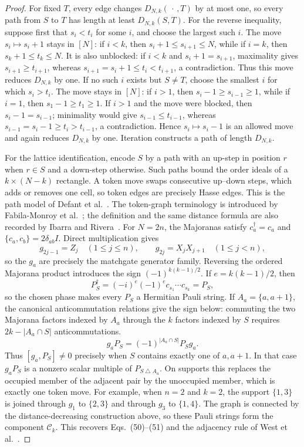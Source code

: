 \documentclass[twoside,10pt]{article}
\numberwithin{equation}{section}
\theoremstyle{slbody}
\theoremstyle{definition}
\theoremstyle{remark}
\newcommand{\1}{\mathbf{1}}
\begin{document}
\begin{proof}
For fixed $T$, every edge changes $D_{N,k}(\,\cdot\,,T)$ by at most one, so
every path from $S$ to $T$ has length at least $D_{N,k}(S,T)$.  For the reverse
inequality, suppose first
that $s_i<t_i$ for some $i$, and choose the largest such $i$.  The move
$s_i\mapsto s_i+1$ stays in $[N]$: if $i<k$, then
$s_i+1\leq s_{i+1}\leq N$, while if $i=k$, then
$s_k+1\leq t_k\leq N$.  It is also unblocked: if $i<k$ and
$s_i+1=s_{i+1}$, maximality gives $s_{i+1}\geq t_{i+1}$, whereas
$s_{i+1}=s_i+1\leq t_i<t_{i+1}$, a contradiction.  Thus this move reduces
$D_{N,k}$ by one.  If no such $i$ exists but $S\neq T$, choose the smallest
$i$ for which $s_i>t_i$.  The move stays in $[N]$: if $i>1$, then
$s_i-1\geq s_{i-1}\geq1$, while if $i=1$, then
$s_1-1\geq t_1\geq1$.  If $i>1$ and the move were blocked, then
$s_i-1=s_{i-1}$; minimality would give $s_{i-1}\leq t_{i-1}$, whereas
$s_{i-1}=s_i-1\geq t_i>t_{i-1}$, a contradiction.  Hence
$s_i\mapsto s_i-1$ is an allowed move and again reduces $D_{N,k}$ by one.
Iteration constructs a path of length $D_{N,k}$.

For the lattice identification, encode $S$ by a path with an up-step in
position $r$ when $r\in S$ and a down-step otherwise.  Such paths bound the
order ideals of a $k\times(N-k)$ rectangle.  A token move swaps consecutive
up--down steps, which adds or removes one cell, so token edges are precisely
Hasse edges.  This is the path model of Defant et
al.~\cite[Section~1.3 and Eq.~(2)]{DefantEtAl}.  The token-graph terminology
is introduced by Fabila-Monroy et al.~\cite{FabilaMonroy}; the definition and
the same distance formula are also recorded by Ibarra and
Rivera~\cite[Definition in Section~1 and Lemma~5.2]{IbarraRivera}.  For
$N=2n$, the Majoranas satisfy $c_a^\dagger=c_a$ and
$\{c_a,c_b\}=2\delta_{ab}I$.  Direct multiplication gives
\[
 g_{2j-1}=Z_j\quad(1\leq j\leq n),\qquad
 g_{2j}=X_jX_{j+1}\quad(1\leq j<n),
\]
so the $g_a$ are precisely the matchgate generator family.  Reversing the
ordered Majorana product introduces the sign
$(-1)^{k(k-1)/2}$.  If $e=k(k-1)/2$, then
\[
 P_S^\dagger=(-i)^e(-1)^e c_{s_1}\cdots c_{s_k}=P_S,
\]
so the chosen phase makes every $P_S$ a Hermitian Pauli string.  If
$A_a=\{a,a+1\}$, the canonical anticommutation
relations give the sign below: commuting the two Majorana factors indexed by
$A_a$ through the $k$ factors indexed by $S$ requires
$2k-|A_a\cap S|$ anticommutations.
\[
 g_aP_S=(-1)^{|A_a\cap S|}P_Sg_a.
\]
Thus $[g_a,P_S]\neq0$ precisely when $S$ contains exactly one of $a,a+1$.
In that case $g_aP_S$ is a nonzero scalar multiple of
$P_{S\mathbin{\triangle}A_a}$.  On supports this replaces the occupied member
of the adjacent pair by the unoccupied member, which is exactly one token
move.  For example, when $n=2$ and $k=2$, the support $\{1,3\}$ is joined
through $g_1$ to $\{2,3\}$ and through $g_3$ to $\{1,4\}$.  The graph is
connected by the distance-decreasing construction above, so these Pauli
strings form the component $\mathcal C_k$.  This recovers Eqs.~(50)--(51) and
the adjacency rule of West et
al.~\cite[Section~IV and Appendix~C]{WestEtAl}.
\end{proof}
\end{document}
